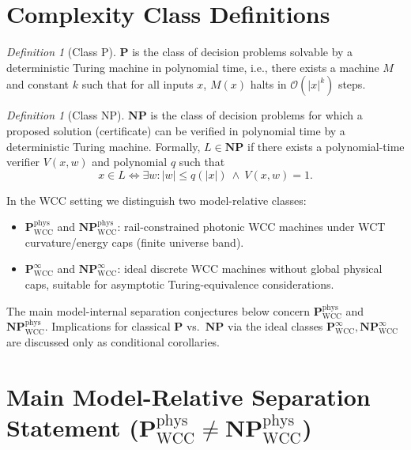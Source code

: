 \documentclass[12pt]{article}
\theoremstyle{remark}
\newtheorem{definition}[theorem]{Definition}
\begin{document}

\section{Complexity Class Definitions}

\begin{definition}[Class P]
$\mathbf{P}$ is the class of decision problems solvable by a deterministic
Turing machine in polynomial time, i.e., there exists a machine $M$ and
constant $k$ such that for all inputs $x$, $M(x)$ halts in
$\mathcal{O}(|x|^k)$ steps.
\end{definition}

\begin{definition}[Class NP]
$\mathbf{NP}$ is the class of decision problems for which a proposed solution
(certificate) can be verified in polynomial time by a deterministic Turing
machine. Formally, $L \in \mathbf{NP}$ if there exists a polynomial-time
verifier $V(x, w)$ and polynomial $q$ such that
\[
x \in L \iff \exists w : |w|\le q(|x|)\ \land\ V(x, w) = 1.
\]
\end{definition}

In the WCC setting we distinguish two model-relative classes:

\begin{itemize}
  \item $\mathbf{P}_{\mathrm{WCC}}^{\mathrm{phys}}$ and
        $\mathbf{NP}_{\mathrm{WCC}}^{\mathrm{phys}}$:
        rail-constrained photonic WCC machines under WCT curvature/energy
        caps (finite universe band).
  \item $\mathbf{P}_{\mathrm{WCC}}^{\infty}$ and
        $\mathbf{NP}_{\mathrm{WCC}}^{\infty}$:
        ideal discrete WCC machines without global physical caps, suitable
        for asymptotic Turing-equivalence considerations.
\end{itemize}

The main model-internal separation conjectures below concern
$\mathbf{P}_{\mathrm{WCC}}^{\mathrm{phys}}$ and
$\mathbf{NP}_{\mathrm{WCC}}^{\mathrm{phys}}$. Implications for classical
$\mathbf{P}$ vs.\ $\mathbf{NP}$ via the ideal classes
$\mathbf{P}_{\mathrm{WCC}}^{\infty}, \mathbf{NP}_{\mathrm{WCC}}^{\infty}$
are discussed only as conditional corollaries.


\clearpage


\section{Main Model-Relative Separation Statement
\texorpdfstring{ ($\mathbf{P}_{\mathrm{WCC}}^{\mathrm{phys}} \ne
                 \mathbf{NP}_{\mathrm{WCC}}^{\mathrm{phys}}$)}
                {Main Model-Relative Separation Statement: PWCCphys != NPWCCphys}}
\end{document}
